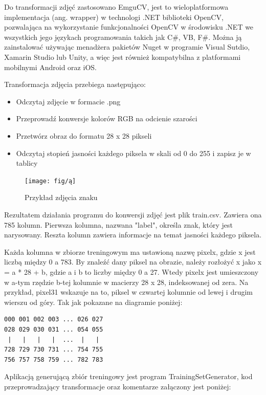 \documentclass[brudnopis]{xmgr}
\begin{document}
Do transformacji zdjęć zastosowano EmguCV, jest to wieloplatformowa implementacja (ang. wrapper) w technologi .NET biblioteki OpenCV, pozwalająca na wykorzystanie funkcjonalności OpenCV w środowisku .NET we wszystkich jego językach programowania takich jak C\#, VB, F\#. Można ją zainstalować używając menadżera pakietów Nuget w programie Visual Sutdio, Xamarin Studio lub Unity, a więc jest również kompatybilna z platformami mobilnymi Android oraz iOS.

Transformacja zdjęcia przebiega następująco:
\begin{itemize}
\item
Odczytaj zdjęcie w formacie .png
\item
Przeprowadź konwersje kolorów RGB na odcienie szarości
\item
Przetwórz obraz do formatu 28 x 28 pikseli
\item
Odczytaj stopień jasności każdego piksela w skali od 0 do 255 i zapisz je w tablicy
\end{itemize}

\begin{figure}[!tbh]
\centering
\texttt{[image: fig/ą]}
\caption{Przykład zdjęcia znaku}
\end{figure}
Rezultatem działania programu do konwersji zdjęć jest plik train.csv. Zawiera ona 785 kolumn. Pierwsza kolumna, nazwana "label", określa znak, który jest narysowany. Reszta kolumn zawiera informacje na temat jasności każdego piksela.

Każda kolumna w zbiorze treningowym ma ustawioną nazwę pixelx, gdzie x jest liczbą między 0 a 783. By znaleźć dany piksel na obrazie, należy rozłożyć x jako x = a * 28 + b, gdzie a i b to liczby między 0 a 27. Wtedy pixelx jest umieszczony w a-tym rzędzie b-tej kolumnie w macierzy 28 x 28, indeksowanej od zera. Na przykład, pixel31 wskazuje na to, piksel w czwartej kolumnie od lewej i drugim wierszu od góry. Tak jak pokazane na diagramie poniżej:

\begin{lstlisting}
000 001 002 003 ... 026 027
028 029 030 031 ... 054 055
 |   |   |   |  ...  |   |
728 729 730 731 ... 754 755
756 757 758 759 ... 782 783 
\end{lstlisting} 

Aplikacją generującą zbiór treningowy jest program TrainingSetGenerator, kod przeprowadzający transformacje oraz komentarze załączony jest poniżej:
\end{document}
